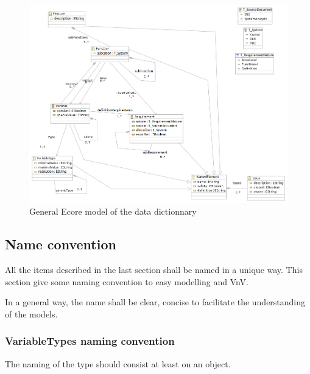 \begin{figure}[ht]
  \centering
  \includegraphics[width=\textwidth]{DataModel/datadictionary.png}
  \caption{General Ecore model of the data dictionnary}
  \label{fig:links}
\end{figure}

\subsection{Name convention}
\label{sec:naming}


All the items described in the last section shall be named in a unique way. 
This section give some naming convention to easy modelling and VnV.

In a general way, the name shall be clear, concise to facilitate the understanding of the models.

\subsubsection{VariableTypes naming convention}

The naming of the type should consist at least on an object.

